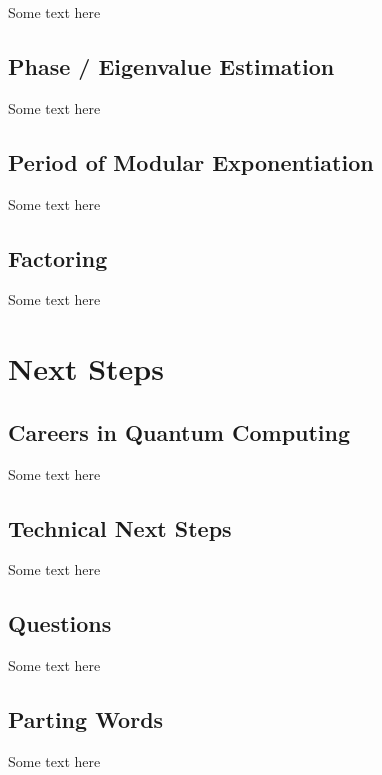 \documentclass{article}
\begin{document}
Some text here

\subsection{Phase / Eigenvalue Estimation}

Some text here

\subsection{Period of Modular Exponentiation}

Some text here

\subsection{Factoring}

Some text here

\section{Next Steps} %

\subsection{Careers in Quantum Computing}

Some text here

\subsection{Technical Next Steps}

Some text here

\subsection{Questions}

Some text here

\subsection{Parting Words}

Some text here
\end{document}
